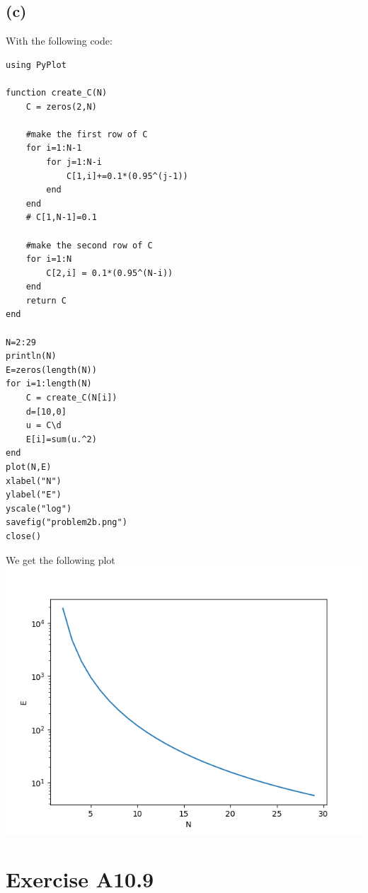 \subsection*{(c)}
With the following code:
\begin{verbatim}
using PyPlot

function create_C(N)
    C = zeros(2,N)

    #make the first row of C 
    for i=1:N-1
        for j=1:N-i
            C[1,i]+=0.1*(0.95^(j-1))
        end
    end
    # C[1,N-1]=0.1 

    #make the second row of C 
    for i=1:N
        C[2,i] = 0.1*(0.95^(N-i))
    end
    return C
end

N=2:29
println(N)
E=zeros(length(N))
for i=1:length(N)
    C = create_C(N[i])
    d=[10,0]
    u = C\d
    E[i]=sum(u.^2)
end
plot(N,E)
xlabel("N")
ylabel("E")
yscale("log")
savefig("problem2b.png")
close()
\end{verbatim}
We get the following plot\\
\includegraphics*[scale=0.7]{problem2b.png}
\section*{Exercise A10.9}
